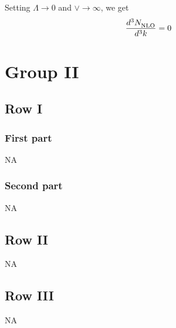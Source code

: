 \documentclass[9pt]{article}
\numberwithin{equation}{section}
\begin{document}
Setting $\Lambda \to 0$ and $\vee \to \infty$, we get
\begin{align}
\frac{d^{3}N_{\rm NLO}^{\rm}}{d^{3}k}  & = 0
\end{align}
\section{Group II}
\subsection{Row I}
\subsubsection{First part}
\textsc{NA}
\subsubsection{Second part}
\textsc{NA}
\subsection{Row II}
\textsc{NA}
\subsection{Row III}
\textsc{NA}
\end{document}
